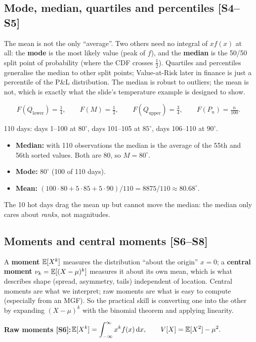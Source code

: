 \documentclass[10pt]{article}
\begin{document}
\subsection{Mode, median, quartiles and percentiles [S4--S5]}
\begin{idea}
The mean is not the only ``average''. Two others need no integral of $x f(x)$ at all: the \textbf{mode} is the most likely value (peak of $f$), and the \textbf{median} is the 50/50 split point of probability (where the CDF crosses $\tfrac12$). Quartiles and percentiles generalise the median to other split points; Value-at-Risk later in finance is just a percentile of the P\&L distribution. The median is robust to outliers; the mean is not, which is exactly what the slide's temperature example is designed to show.
\end{idea}
\[F(Q_{\text{lower}})=\tfrac14,\qquad F(M)=\tfrac12,\qquad F(Q_{\text{upper}})=\tfrac34,\qquad F(P_n)=\tfrac{n}{100}.\]
\begin{where}
\end{where}
\begin{worked}
110 days: days 1--100 at $80^\circ$, days 101--105 at $85^\circ$, days 106--110 at $90^\circ$.
\begin{itemize}
\item \textbf{Median:} with 110 observations the median is the average of the 55th and 56th sorted values. Both are $80$, so $M=80^\circ$.
\item \textbf{Mode:} $80^\circ$ (100 of 110 days).
\item \textbf{Mean:} $(100\cdot80+5\cdot85+5\cdot90)/110=8875/110\approx80.68^\circ$.
\end{itemize}
The 10 hot days drag the mean up but cannot move the median: the median only cares about \emph{ranks}, not magnitudes.
\end{worked}

\subsection{Moments and central moments [S6--S8]}
\begin{idea}
A \textbf{moment} $\mathbb{E}[X^k]$ measures the distribution ``about the origin'' $x=0$; a \textbf{central moment} $\nu_k=\mathbb{E}[(X-\mu)^k]$ measures it about its own mean, which is what describes shape (spread, asymmetry, tails) independent of location. Central moments are what we interpret; raw moments are what is easy to compute (especially from an MGF). So the practical skill is converting one into the other by expanding $(X-\mu)^k$ with the binomial theorem and applying linearity.
\end{idea}
\textbf{Raw moments [S6]:}\quad $\displaystyle \mathbb{E}[X^k]=\int_{-\infty}^{\infty}x^kf(x)\,\mathrm{d} x,\qquad V[X]=\mathbb{E}[X^2]-\mu^2.$
\end{document}
